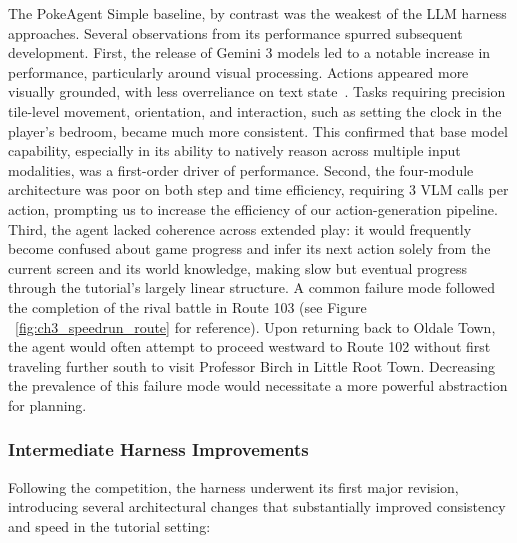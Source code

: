 The PokeAgent Simple baseline, by contrast was the weakest of the LLM harness approaches. Several observations from its performance spurred subsequent development. First, the release of Gemini 3 models led to a notable increase in performance, particularly around visual processing. Actions appeared more visually grounded, with less overreliance on text state~\citep{google2025gemini3}. Tasks requiring precision tile-level movement, orientation, and interaction, such as setting the clock in the player's bedroom, became much more consistent. This confirmed that base model capability, especially in its ability to natively reason across multiple input modalities, was a first-order driver of performance. Second, the four-module architecture was poor on both step and time efficiency, requiring 3 VLM calls per action, prompting us to increase the efficiency of our action-generation pipeline. Third, the agent lacked coherence across extended play: it would frequently become confused about game progress and infer its next action solely from the current screen and its world knowledge, making slow but eventual progress through the tutorial's largely linear structure. A common failure mode followed the completion of the rival battle in Route 103 (see Figure ~\ref{fig:ch3_speedrun_route} for reference). Upon returning back to Oldale Town, the agent would often attempt to proceed westward to Route 102 without first traveling further south to visit Professor Birch in Little Root Town. Decreasing the prevalence of this failure mode would necessitate a more powerful abstraction for planning.



\subsubsection{Intermediate Harness Improvements}\label{sec:benchmark_results}

Following the competition, the \pokeagent{} harness underwent its first major revision, introducing several architectural changes that substantially improved consistency and speed in the tutorial setting:

